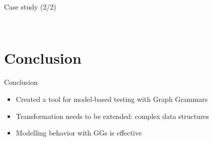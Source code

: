 \documentclass{FMTslides}
\begin{document}
\begin{frame}{Case study (2/2)}
\begin{figure}
\centering
    \hspace{10px}
    \\
    \hspace{10px}
\end{figure}
\end{frame}

\section[Conclusion]{Conclusion}

\begin{frame}{Conclusion}
  \begin{itemize}[<+->]
    \item Created a tool for model-based testing with Graph Grammars
    \item Transformation needs to be extended: complex data structures
    \item Modelling behavior with GGs is effective
  \end{itemize}
\end{frame}
\end{document}
